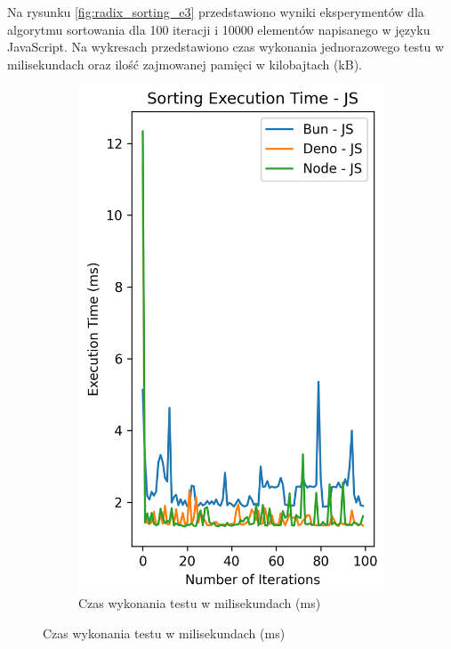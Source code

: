 Na rysunku \ref{fig:radix_sorting_e3} przedstawiono wyniki eksperymentów dla algorytmu sortowania dla 100 iteracji i 10000 elementów napisanego w języku JavaScript. Na wykresach przedstawiono czas wykonania jednorazowego testu w milisekundach oraz ilość zajmowanej pamięci w kilobajtach (kB).

\begin{figure}[H]
  \centering
  \begin{subfigure}[b]{0.42\textwidth}
    \centering
    \includegraphics[width=\textwidth]{Figures/sorting/sorting_radix_100_10000_js_time.png}
    \caption{Czas wykonania testu w milisekundach (ms)}
    \label{fig:radix_sorting_e3_time}

\end{subfigure}
\end{figure}
